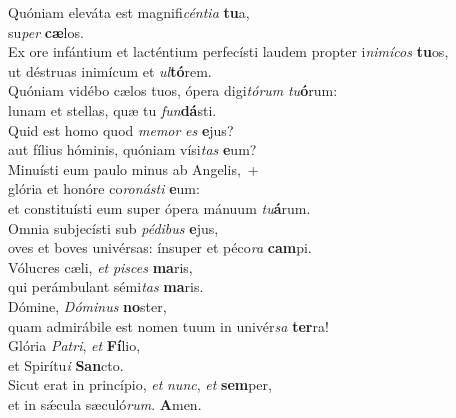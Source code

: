 \evenverse Quóniam eleváta est magnifi\textit{cén}\textit{ti}\textit{a} \textbf{tu}a,~\*\\
\evenverse su\textit{per} \textbf{cæ}los.\\
\oddverse Ex ore infántium et lacténtium perfecísti laudem propter i\textit{ni}\textit{mí}\textit{cos} \textbf{tu}os,~\*\\
\oddverse ut déstruas inimícum et \textit{ul}\textbf{tó}rem.\\
\evenverse Quóniam vidébo cælos tuos, ópera digi\textit{tó}\textit{rum} \textit{tu}\textbf{ó}rum:~\*\\
\evenverse lunam et stellas, quæ tu \textit{fun}\textbf{dá}sti.\\
\oddverse Quid est homo quod \textit{me}\textit{mor} \textit{es} \textbf{e}jus?~\*\\
\oddverse aut fílius hóminis, quóniam vísi\textit{tas} \textbf{e}um?\\
\evenverse Minuísti eum paulo minus ab Angelis,~+\\
\evenverse  glória et honóre co\textit{ro}\textit{ná}\textit{sti} \textbf{e}um:~\*\\
\evenverse et constituísti eum super ópera mánuum \textit{tu}\textbf{á}rum.\\
\oddverse Omnia subjecísti sub \textit{pé}\textit{di}\textit{bus} \textbf{e}jus,~\*\\
\oddverse oves et boves univérsas: ínsuper et péco\textit{ra} \textbf{cam}pi.\\
\evenverse Vólucres cæli, \textit{et} \textit{pi}\textit{sces} \textbf{ma}ris,~\*\\
\evenverse qui perámbulant sémi\textit{tas} \textbf{ma}ris.\\
\oddverse Dómine, \textit{Dó}\textit{mi}\textit{nus} \textbf{no}ster,~\*\\
\oddverse quam admirábile est nomen tuum in univér\textit{sa} \textbf{ter}ra!\\
\evenverse Glória \textit{Pa}\textit{tri}, \textit{et} \textbf{Fí}lio,~\*\\
\evenverse et Spirítu\textit{i} \textbf{San}cto.\\
\oddverse Sicut erat in princípio, \textit{et} \textit{nunc}, \textit{et} \textbf{sem}per,~\*\\
\oddverse et in sǽcula sæculó\textit{rum}. \textbf{A}men.\\
